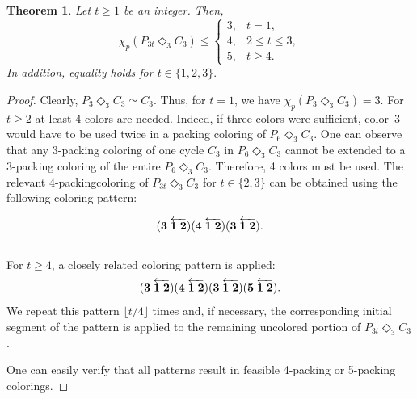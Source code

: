\documentclass{article}
\newtheorem{theorem}{Theorem}
\begin{document}
\begin{theorem}Let $t\geq 1$ be an integer. Then,
    $$\chi_p(P_{3t}\Diamond_3 C_3)\leq\left\{
\begin{array}{ll}
3, & t =1,\\
4, & 2 \leq t\leq 3,\\
5, & t \geq 4.
\end{array}\right.
$$
In addition, equality holds for $t\in\{1,2,3\}.$ 
\end{theorem}
\begin{proof}
    Clearly, $P_{3}\Diamond_3 C_3 \simeq C_3$. Thus, for $t=1$, we have $\chi_p(P_{3}\Diamond_3 C_3)=3$. For $t\geq 2$ at least 4 colors are needed. Indeed, if three colors were sufficient, color~$3$ would have to be used twice in a packing coloring of $P_6 \Diamond_3 C_3$. One can observe that any 3-packing coloring of one cycle $C_3$ in $P_6 \Diamond_3 C_3$ cannot be extended to a 3-packing coloring of the entire $P_6 \Diamond_3 C_3$. Therefore, 4 colors must be used. The relevant 4-packingcoloring of $P_{3t}\Diamond_3 C_3$ for $t \in \{2,3\}$ can be obtained using the following coloring pattern:

    $$({\bf 3}\; \overleftarrow{{\bf 1\;2}})({\bf 4}\; \overleftarrow{{\bf 1\;2}})({\bf 3}\; \overleftarrow{{\bf 1\;2}}).$$
\\    For $t\geq 4$, a closely related coloring pattern is applied: 
    $$({\bf 3}\; \overleftarrow{{\bf 1\;2}})({\bf 4}\; \overleftarrow{{\bf 1\;2}})({\bf 3}\; \overleftarrow{{\bf 1\;2}})({\bf 5}\; \overleftarrow{{\bf 1\;2}}).$$
    We repeat this pattern $\lfloor t/4 \rfloor$ times and, if necessary, the corresponding initial segment of the pattern is applied to the remaining uncolored portion of $P_{3t} \Diamond_3 C_3$.

    One can easily verify that all patterns result in feasible 4-packing or 5-packing colorings. %
\end{proof}
\end{document}
